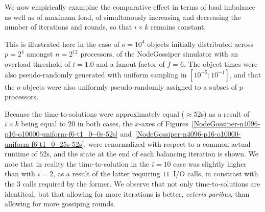We now empirically exampine the comparative effect in terms of load
imbalance as well as of maximum load, of simultanously increasing and
decreasing the number of iterations and rounds, so that $i\times{k}$
remains constant.

This is illustrated here in the case of $o=10^4$ objects initially
distributed across $p=2^4$ amongst $n=2^{12}$ processors, of the
\textsf{NodeGossiper} simulator with an overload threshold of $t=1.0$
and a fanout factor of $f=6$.
The object times were also pseudo-randomly generated with uniform
sampling in $[10^{-5};10^{-1}]$, and that the $o$ objects were also
uniformly pseudo-randomly assigned to a subset of $p$ processors.

Because the time-to-solutions were approximately equal ($\approx52$s)
as a result of $i\times{k}$ being equal to $20$ in both cases, 
the $x$-axes of
Figures~\ref{NodeGossiper-n4096-p16-o10000-uniform-f6-t1_0--0s-52s}
and~\ref{NodeGossiper-n4096-p16-o10000-uniform-f6-t1_0--25s-52s},
were renormalized with respect to a common actual runtime of $52$s,
and the state at the end of each balancing iteration is shown. We note
that in reality the time-to-solution in the $i=10$ case was slightly
higher than with $i=2$, as a result of the latter requiring $11$~I/O
calls, in constrast with the $3$ calls required by the former.
We observe that not only time-to-solutions are identitcal, but that
allowing for more iterations is better, \emph{ceteris paribus}, than
allowing for more gossiping rounds.